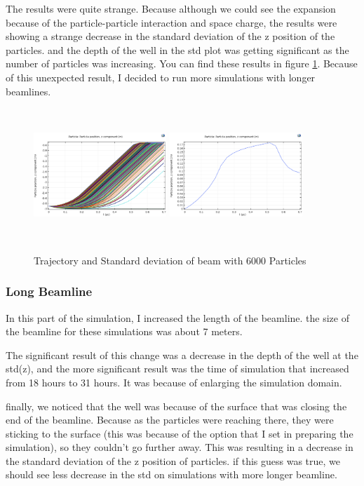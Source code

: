 \documentclass[12pt,a4paper]{article}
\begin{document}
The results were quite strange. Because although we could see the expansion because of the particle-particle interaction and space charge, the results were showing a strange decrease in the standard deviation of the z position of the particles. and the depth of the well in the std plot was getting significant as the number of particles was increasing. You can find these results in figure \ref{short}. Because of this unexpected result, I decided to run more simulations with longer beamlines.

\begin{figure}[h!]
\centering
\includegraphics[width=50mm, height=50mm]{sim-in-6000}
\includegraphics[width=50mm, height=50mm]{sim-std-6000}
\caption{Trajectory and Standard deviation of beam with 6000 Particles}
\label{short}
\end{figure}

\subsubsection{Long Beamline}
In this part of the simulation, I increased the length of the beamline. the size of the beamline for these simulations was about 7 meters. 

The significant result of this change was a decrease in the depth of the well at the std(z), and the more significant result was the time of simulation that increased from 18 hours to 31 hours. It was because of enlarging the simulation domain.

 finally, we noticed that the well was because of the surface that was closing the end of the beamline. Because as the particles were reaching there, they were sticking to the surface (this was because of the option that I set in preparing the simulation), so they couldn't go further away. This was resulting in a decrease in the standard deviation of the z position of particles. if this guess was true, we should see less decrease in the std on simulations with more longer beamline.
 
\end{document}
